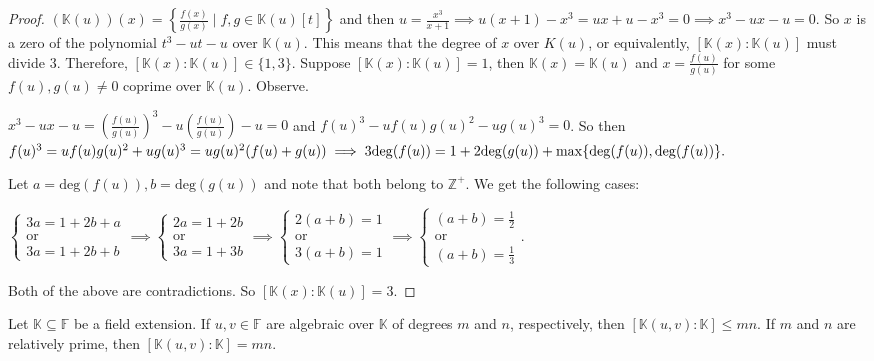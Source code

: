 \documentclass[addpoints,10pt]{exam}
\theoremstyle{plain}
\theoremstyle{definition}
\newtheorem{prob}[thm]{Problem}
\theoremstyle{plain}
\theoremstyle{plain}
\theoremstyle{definition}
\let\oldprob\prob
\let\endoldprob\endprob
\renewenvironment{prob}
  {\begin{singlespace}\oldprob}
  {\endoldprob\end{singlespace}}
\newcommand{\FF}{\ensuremath{\mathbb{F}}}
\newcommand{\KK}{\ensuremath{\mathbb{K}}}
\newcommand{\ZZ}{\ensuremath{\mathbb{Z}}}
\begin{document}
\begin{proof}
$(\KK(u))(x)=\left\{\frac{f(x)}{g(x)}\mid f,g\in \KK(u)[t]\right\}$ and then $u=\frac{x^{3}}{x+1}\implies u(x+1)-x^{3}=ux+u-x^{3}=0\implies x^{3}-ux-u=0$. So $x$ is a zero of the polynomial $t^{3}-ut-u$ over $\KK(u)$. This means that the degree of $x$ over $K(u)$, or equivalently, $[\KK(x):\KK(u)]$ must divide $3$. Therefore, $[\KK(x):\KK(u)]\in \{1,3\}$. Suppose $[\KK(x):\KK(u)]=1$, then $\KK(x)=\KK(u)$ and $x=\frac{f(u)}{g(u)}$ for some $f(u),g(u)\neq 0$ coprime over $\KK(u)$. Observe. 
\begin{center}
  $x^{3}-ux-u=(\frac{f(u)}{g(u)})^{3}-u(\frac{f(u)}{g(u)})-u=0$ and $f(u)^{3}-uf(u)g(u)^{2}-ug(u)^{3}=0$. So then $f(u)^{3}=uf(u)g(u)^{2}+ug(u)^{3}=ug(u)^{2}(f(u)+g(u))\newline\implies 3\mathrm{deg}(f(u))=1+2\mathrm{deg}(g(u))+\mathrm{max}\{\mathrm{deg}(f(u)),\mathrm{deg}(f(u))\}.$
\end{center}
Let $a=\mathrm{deg}(f(u)),b=\mathrm{deg}(g(u))$ and note that both belong to $\ZZ^{+}$. We get the following cases:
\begin{center}
  $\begin{cases} 3a=1+2b+a\\ \text{or} \\ 3a=1+2b+b\end{cases}\implies \begin{cases} 2a=1+2b\\ \text{or} \\ 3a=1+3b\end{cases}\implies \begin{cases} 2(a+b)=1\\ \text{or} \\ 3(a+b)=1\end{cases}\implies \begin{cases} (a+b)=\frac{1}{2}\\ \text{or} \\ (a+b)=\frac{1}{3}\end{cases}.$
\end{center}
Both of the above are contradictions. So $[\KK(x):\KK(u)]=3$.

\end{proof}
\newpage
\begin{prob}
Let $\KK\subseteq \FF$ be a field extension. If $u,v\in \FF$ are algebraic over $\KK$ of degrees $m$ and $n$, respectively, then $[\KK(u,v): \KK]\leq mn.$ If $m$ and $n$ are relatively prime, then $[\KK(u,v):\KK]=mn.$
\end{prob}
\end{document}
